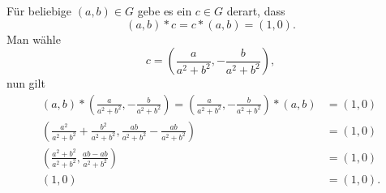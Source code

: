\documentclass{article}
\begin{document}
\begin{enumerate}[label=\arabic*.]
    Für beliebige $(a, b) \in G$ gebe es ein $c \in G$ derart, dass
    \begin{equation*}
        (a, b) * c = c * (a, b) = (1, 0).
    \end{equation*}
    Man wähle
    \begin{equation*}
        c = \left(\frac{a}{a^2 + b^2}, -\frac{b}{a^2 + b^2}\right),
    \end{equation*}
    nun gilt
    \begin{align*}
        (a, b) * \left(\frac{a}{a^2 + b^2}, -\frac{b}{a^2 + b^2}\right) = \left(\frac{a}{a^2 + b^2}, -\frac{b}{a^2 + b^2}\right) * (a, b) &= (1, 0)\\
        \left(\frac{a^2}{a^2+b^2} + \frac{b^2}{a^2 + b^2}, \frac{ab}{a^2+b^2} - \frac{ab}{a^2+b^2}\right) &= (1, 0)\\
        \left(\frac{a^2 + b^2}{a^2+b^2}, \frac{ab - ab}{a^2+b^2}\right) &= (1, 0)\\
        (1, 0) &= (1, 0).\\
    \end{align*}
\end{enumerate}
\end{document}
